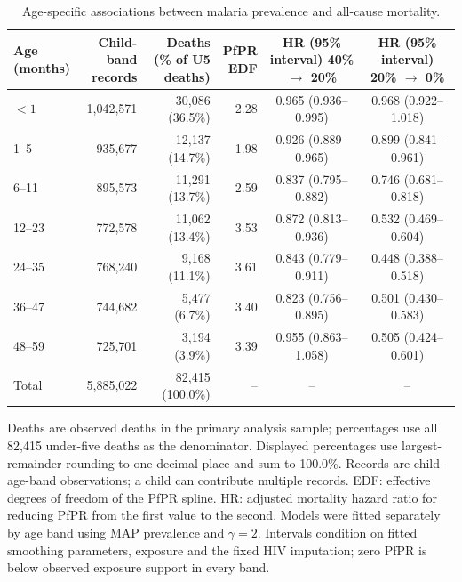 \begin{table}[tbp]
\centering
\caption{Age-specific associations between malaria prevalence and all-cause mortality.}
\label{tab:primary-age-band-effects}
\small
\setlength{\tabcolsep}{3pt}
\renewcommand{\arraystretch}{1.15}
\begin{tabular*}{\linewidth}{@{\extracolsep{\fill}}lrrrcc@{}}
\toprule
\shortstack[l]{Age\\(months)} & \shortstack{Child-band\\records} & \shortstack{Deaths\\(\% of U5 deaths)} & \shortstack{PfPR\\EDF} & \shortstack{HR (95\% interval)\\40\% $\to$ 20\%} & \shortstack{HR (95\% interval)\\20\% $\to$ 0\%} \\
\midrule
$<1$ & 1,042,571 & 30,086 (36.5\%) & 2.28 & 0.965 (0.936--0.995) & 0.968 (0.922--1.018) \\
1--5 & 935,677 & 12,137 (14.7\%) & 1.98 & 0.926 (0.889--0.965) & 0.899 (0.841--0.961) \\
6--11 & 895,573 & 11,291 (13.7\%) & 2.59 & 0.837 (0.795--0.882) & 0.746 (0.681--0.818) \\
12--23 & 772,578 & 11,062 (13.4\%) & 3.53 & 0.872 (0.813--0.936) & 0.532 (0.469--0.604) \\
24--35 & 768,240 & 9,168 (11.1\%) & 3.61 & 0.843 (0.779--0.911) & 0.448 (0.388--0.518) \\
36--47 & 744,682 & 5,477 (6.7\%) & 3.40 & 0.823 (0.756--0.895) & 0.501 (0.430--0.583) \\
48--59 & 725,701 & 3,194 (3.9\%) & 3.39 & 0.955 (0.863--1.058) & 0.505 (0.424--0.601) \\
\midrule
Total & 5,885,022 & 82,415 (100.0\%) & -- & -- & -- \\
\bottomrule
\end{tabular*}
\par\vspace{0.5em}
\begin{minipage}{\linewidth}
\footnotesize
Deaths are observed deaths in the primary analysis sample; percentages use all 82,415 under-five deaths as the denominator.
Displayed percentages use largest-remainder rounding to one decimal place and sum to 100.0\%.
Records are child--age-band observations; a child can contribute multiple records.
EDF: effective degrees of freedom of the PfPR spline. HR: adjusted mortality hazard ratio for reducing PfPR from the first value to the second.
Models were fitted separately by age band using MAP prevalence and $\gamma=2$.
Intervals condition on fitted smoothing parameters, exposure and the fixed HIV imputation; zero PfPR is below observed exposure support in every band.
\end{minipage}
\end{table}
